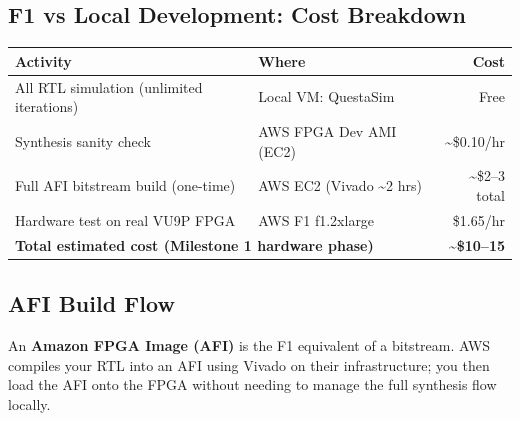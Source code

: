 \documentclass[11pt,a4paper]{article}
\begin{document}
\subsection{F1 vs Local Development: Cost Breakdown}

\begin{center}
\small
\begin{tabular}{l l r}
\toprule
\textbf{Activity} & \textbf{Where} & \textbf{Cost} \\
\midrule
All RTL simulation (unlimited iterations) & Local VM: QuestaSim & Free \\
Synthesis sanity check                    & AWS FPGA Dev AMI (EC2) & \textasciitilde\$0.10/hr \\
Full AFI bitstream build (one-time)       & AWS EC2 (Vivado \textasciitilde{}2 hrs) & \textasciitilde\$2--3 total \\
Hardware test on real VU9P FPGA           & AWS F1 f1.2xlarge & \$1.65/hr \\
\midrule
\multicolumn{2}{l}{\bfseries Total estimated cost (Milestone 1 hardware phase)} & \textbf{\textasciitilde\$10--15} \\
\bottomrule
\end{tabular}
\end{center}

\subsection{AFI Build Flow}

An \textbf{Amazon FPGA Image (AFI)} is the F1 equivalent of a bitstream.
AWS compiles your RTL into an AFI using Vivado on their infrastructure; you
then load the AFI onto the FPGA without needing to manage the full synthesis flow locally.
\end{document}
